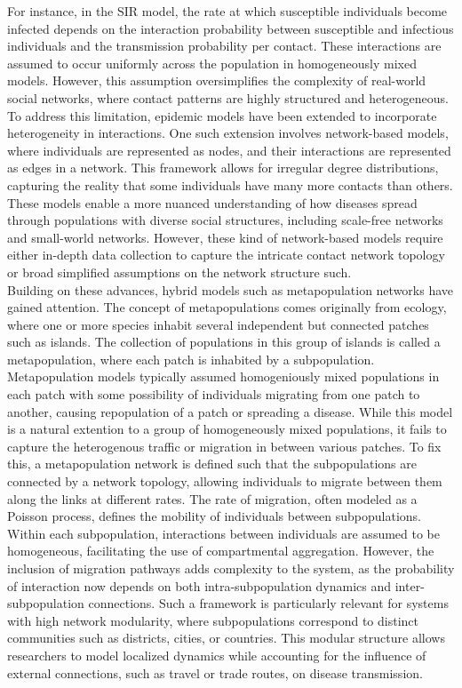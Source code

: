 For instance, in the SIR model, the rate at which susceptible individuals become infected depends on the interaction probability between susceptible and infectious individuals and the transmission probability per contact. These interactions are assumed to occur uniformly across the population in homogeneously mixed models. However, this assumption oversimplifies the complexity of real-world social networks, where contact patterns are highly structured and heterogeneous.\\

To address this limitation, epidemic models have been extended to incorporate heterogeneity in interactions. One such extension involves network-based models, where individuals are represented as nodes, and their interactions are represented as edges in a network. This framework allows for irregular degree distributions, capturing the reality that some individuals have many more contacts than others. These models enable a more nuanced understanding of how diseases spread through populations with diverse social structures, including scale-free networks and small-world networks. However, these kind of network-based models require either in-depth data collection to capture the intricate contact network topology or broad simplified assumptions on the network structure such.    \\

Building on these advances, hybrid models such as metapopulation networks have gained attention. The concept of metapopulations comes originally from ecology, where one or more species inhabit several independent but connected patches such as islands. The collection of populations in this group of islands is called a metapopulation, where each patch is inhabited by a subpopulation. Metapopulation models typically assumed homogeniously mixed populations in each patch with some possibility of individuals migrating from one patch to another, causing repopulation of a patch or spreading a disease. While this model is a natural extention to a group of homogeneously mixed populations, it fails to capture the heterogenous traffic or migration in between various patches. To fix this, a metapopulation network is defined such that the subpopulations are connected by a network topology, allowing individuals to migrate between them along the links at different rates. The rate of migration, often modeled as a Poisson process, defines the mobility of individuals between subpopulations. Within each subpopulation, interactions between individuals are assumed to be homogeneous, facilitating the use of compartmental aggregation. However, the inclusion of migration pathways adds complexity to the system, as the probability of interaction now depends on both intra-subpopulation dynamics and inter-subpopulation connections. Such a framework is particularly relevant for systems with high network modularity, where subpopulations correspond to distinct communities such as districts, cities, or countries. This modular structure allows researchers to model localized dynamics while accounting for the influence of external connections, such as travel or trade routes, on disease transmission.\\

